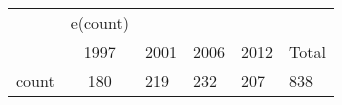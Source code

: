 \begin{tabular}{l*{1}{c}} \toprule
            &    e(count)&            &            &            &            \\
            &        1997&        2001&        2006&        2012&       Total\\
\midrule
count       &         180&         219&         232&         207&         838\\
\bottomrule
\end{tabular}
